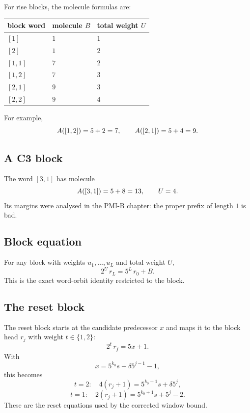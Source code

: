 For rise blocks, the molecule formulas are:
\begin{center}
\small
\begin{tabular}{@{}lll@{}}
\toprule
block word & molecule $B$ & total weight $U$ \\
\midrule
$[1]$ & $1$ & $1$ \\
$[2]$ & $1$ & $2$ \\
$[1,1]$ & $7$ & $2$ \\
$[1,2]$ & $7$ & $3$ \\
$[2,1]$ & $9$ & $3$ \\
$[2,2]$ & $9$ & $4$ \\
\bottomrule
\end{tabular}
\end{center}
For example,
\begin{equation*}
  A([1,2])=5+2=7,
  \qquad
  A([2,1])=5+4=9.
\end{equation*}

\subsection{A C3 block}

The word $[3,1]$ has molecule
\begin{equation*}
  A([3,1])=5+8=13,
  \qquad
  U=4.
\end{equation*}
Its margins were analysed in the PMI-B chapter: the proper prefix of
length $1$ is bad.

\subsection{Block equation}

For any block with weights $u_1,\dots,u_L$ and total weight $U$,
\begin{equation*}
  2^U\,r_L=5^L\,r_0+B.
\end{equation*}
This is the exact word-orbit identity restricted to the block.

\subsection{The reset block}

The reset block starts at the candidate predecessor $x$ and maps it
to the block head $r_j$ with weight $t\in\{1,2\}$:
\begin{equation*}
  2^t\,r_j=5x+1.
\end{equation*}
With
\begin{equation*}
  x=5^{k_0}s+\delta5^{j-1}-1,
\end{equation*}
this becomes
\begin{equation*}
  t=2:\quad 4(r_j+1)=5^{k_0+1}s+\delta5^j,
\end{equation*}
\begin{equation*}
  t=1:\quad 2(r_j+1)=5^{k_0+1}s+5^j-2.
\end{equation*}
These are the reset equations used by the corrected window bound.

